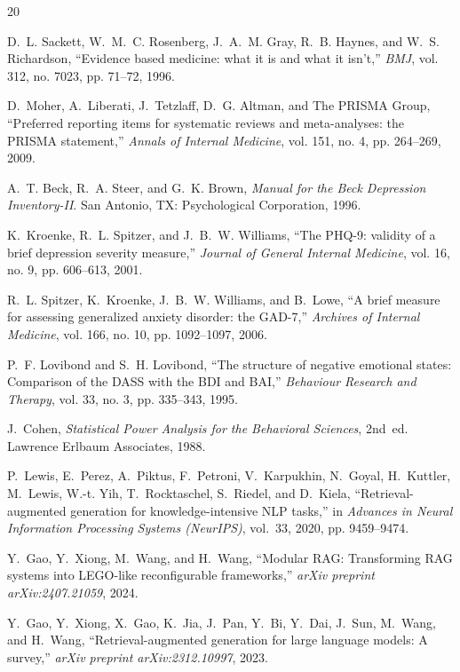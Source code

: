 \documentclass[10pt]{SPIIRAS_Proceedings}
\begin{document}
\begin{thebibliography}{20}

D.~L. Sackett, W.~M.~C. Rosenberg, J.~A.~M. Gray, R.~B. Haynes, and W.~S. Richardson, ``Evidence based medicine: what it is and what it isn't,'' \emph{BMJ}, vol. 312, no. 7023, pp. 71--72, 1996.

D.~Moher, A.~Liberati, J.~Tetzlaff, D.~G. Altman, and {The PRISMA Group}, ``Preferred reporting items for systematic reviews and meta-analyses: the PRISMA statement,'' \emph{Annals of Internal Medicine}, vol. 151, no. 4, pp. 264--269, 2009.

A.~T. Beck, R.~A. Steer, and G.~K. Brown, \emph{Manual for the Beck Depression Inventory-II}. San Antonio, TX: Psychological Corporation, 1996.

K.~Kroenke, R.~L. Spitzer, and J.~B.~W. Williams, ``The PHQ-9: validity of a brief depression severity measure,'' \emph{Journal of General Internal Medicine}, vol. 16, no. 9, pp. 606--613, 2001.

R.~L. Spitzer, K.~Kroenke, J.~B.~W. Williams, and B.~Lowe, ``A brief measure for assessing generalized anxiety disorder: the GAD-7,'' \emph{Archives of Internal Medicine}, vol. 166, no. 10, pp. 1092--1097, 2006.

P.~F. Lovibond and S.~H. Lovibond, ``The structure of negative emotional states: Comparison of the DASS with the BDI and BAI,'' \emph{Behaviour Research and Therapy}, vol. 33, no. 3, pp. 335--343, 1995.

J.~Cohen, \emph{Statistical Power Analysis for the Behavioral Sciences}, 2nd~ed. Lawrence Erlbaum Associates, 1988.

P.~Lewis, E.~Perez, A.~Piktus, F.~Petroni, V.~Karpukhin, N.~Goyal, H.~Kuttler, M.~Lewis, W.-t. Yih, T.~Rocktaschel, S.~Riedel, and D.~Kiela, ``Retrieval-augmented generation for knowledge-intensive NLP tasks,'' in \emph{Advances in Neural Information Processing Systems (NeurIPS)}, vol.~33, 2020, pp. 9459--9474.

Y.~Gao, Y.~Xiong, M.~Wang, and H.~Wang, ``Modular RAG: Transforming RAG systems into LEGO-like reconfigurable frameworks,'' \emph{arXiv preprint arXiv:2407.21059}, 2024.

Y.~Gao, Y.~Xiong, X.~Gao, K.~Jia, J.~Pan, Y.~Bi, Y.~Dai, J.~Sun, M.~Wang, and H.~Wang, ``Retrieval-augmented generation for large language models: A survey,'' \emph{arXiv preprint arXiv:2312.10997}, 2023.


\end{thebibliography}
\end{document}
